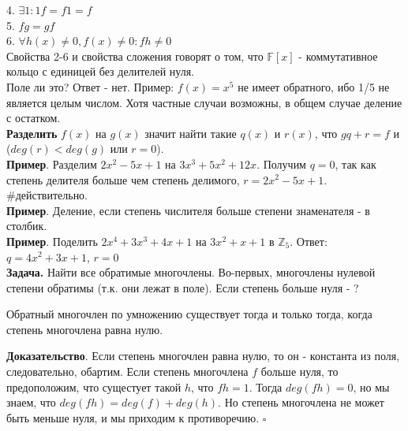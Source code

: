 4. $\exists 1\colon 1f=f1=f $\\
5. $fg=gf$\\
6. $\forall h(x)\ne0, f(x)\ne0\colon fh\ne0 $ \\
Свойства 2-6 и свойства сложения говорят о том, что $\mathbb F[x]$ -
коммутативное кольцо с единицей без делителей нуля. \\
Поле ли это? Ответ - нет. Пример: $f(x)=x^5$ не имеет обратного, ибо 1/5 не 
является целым числом. Хотя частные случаи возможны, в общем случае деление 
с остатком.\\
\textbf{Разделить} $f(x)$ на $g(x)$ значит найти такие $q(x)$ и $r(x)$, что 
$gq+r=f$ и ($deg(r)<deg(g)$ или $r=0$).\\
\textbf{Пример}. Разделим $2x^2-5x+1$ на $3x^3+5x^2+12x$. Получим $q=0$, 
так как степень делителя больше чем степень делимого, $r=2x^2-5x+1$. 
\#действительно.\\
\textbf{Пример}. Деление, если степень числителя больше степени знаменателя -
в столбик. \\
\textbf{Пример}. Поделить $2x^4+3x^3+4x+1$ на $3x^2+x+1$ в $\mathbb Z_5$. 
Ответ: $q=4x^2+3x+1$, $r=0$\\
\textbf{Задача.} Найти все обратимые многочлены. Во-первых, многочлены 
нулевой степени обратимы (т.к. они лежат в поле). Если степень больше нуля - ?
\begin{theor}
Обратный многочлен по умножению существует тогда и только тогда, когда
степень многочлена равна нулю. 
\end{theor}
\textbf{Доказательство}. Если степень многочлен равна нулю, то он -
константа из поля, следовательно, обартим. Если степень многочлена $f$ 
больше нуля, то предоположим, что сущестует такой $h$, что $fh=1$. Тогда
$deg(fh)=0$, но мы знаем, что $deg(fh)=deg(f)+deg(h)$. Но степень многочлена 
не может быть меньше нуля, и мы приходим к противоречию. $\square$

